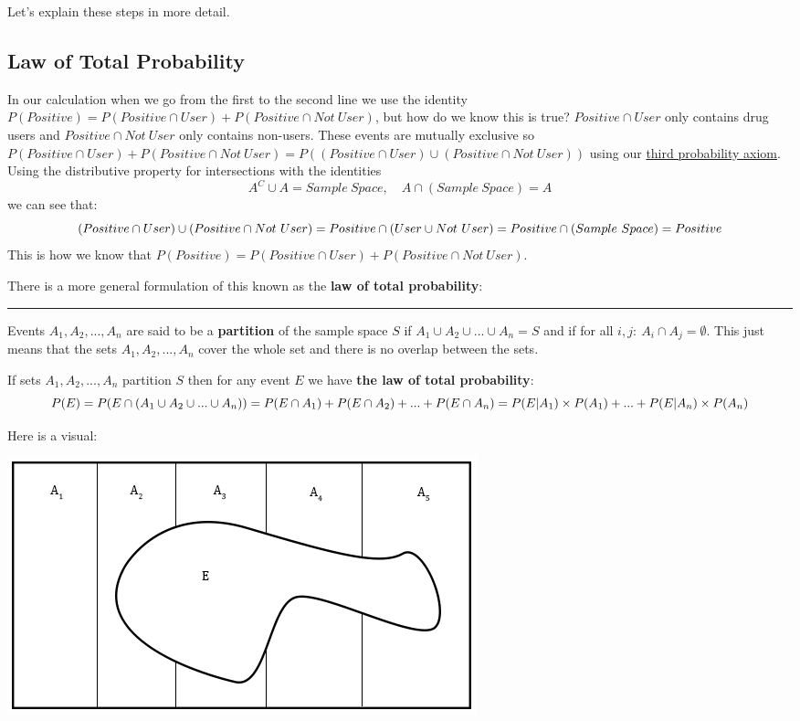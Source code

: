 \documentclass[
]{book}
\begin{document}
Let's explain these steps in more detail.

\hypertarget{law-of-total-probability}{%
\subsection{Law of Total Probability}\label{law-of-total-probability}}

In our calculation when we go from the first to the second line we use the identity \(P(Positive)=P(Positive \cap User)+P(Positive \cap Not \ User)\), but how do we know this is true?
\(Positive \cap User\) only contains drug users and \(Positive \cap Not \ User\) only contains non-users. These events are mutually exclusive so \(P(Positive \cap User)+P(Positive \cap Not \ User) = P((Positive \cap User) \cup (Positive \cap Not \ User))\) using our \protect\hyperlink{axiomsprob}{third probability axiom}. Using the distributive property for intersections with the identities
\[A^C \cup A = Sample \ Space, \quad A \cap (Sample \ Space) = A\]
we can see that:
\[(Positive \cap User) \cup (Positive \cap Not \ User) = Positive \cap (User \cup Not \ User) = \\ Positive \cap (Sample \ Space) = Positive\]
This is how we know that \(P(Positive)=P(Positive \cap User)+P(Positive \cap Not \ User)\).

There is a more general formulation of this known as the \textbf{law of total probability}:

\begin{center}\rule{0.5\linewidth}{0.5pt}\end{center}

Events \(A_1,A_2,...,A_n\) are said to be a \textbf{partition} of the sample space \(S\) if \(A_1 \cup A_2 \cup... \cup A_n=S\) and if for all \(i,j: \ A_i \cap A_j = \emptyset\). This just means that the sets \(A_1,A_2,...,A_n\) cover the whole set and there is no overlap between the sets.

If sets \(A_1,A_2,...,A_n\) partition \(S\) then for any event \(E\) we have \textbf{the law of total probability}:
\[P(E) = P(E \cap (A_1 \cup A_2 \cup ... \cup A_n)) = \\ P(E \cap A_1) + P(E \cap A_2) + ... + P(E \cap A_n) = \\ P(E|A_1) \times P(A_1) +...+ P(E|A_n) \times P(A_n)\]

Here is a visual:

\includegraphics{Pictures/03-Probability/totalprob.PNG}
\end{document}
